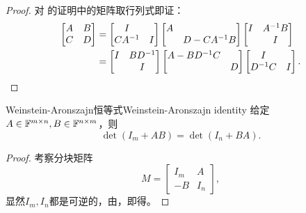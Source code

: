 \begin{proof}
	对 的证明中的矩阵取行列式即证：
	\begin{align*}
		\begin{bmatrix}
			A&B\\C&D
		\end{bmatrix}&=\begin{bmatrix}
			I\\CA^{-1}&I
		\end{bmatrix}\begin{bmatrix}
			A\\ &D-CA^{-1} B
		\end{bmatrix}\begin{bmatrix}
			I&A^{-1} B\\ &I
		\end{bmatrix}\\
		&=\begin{bmatrix}
			I&BD^{-1}\\ &I
		\end{bmatrix}\begin{bmatrix}
			A-BD^{-1} C\\ &D
		\end{bmatrix}\begin{bmatrix}
			I\\D^{-1} C&I
		\end{bmatrix}.
		\qedhere
	\end{align*}
\end{proof}

\begin{theorem}
	{Weinstein-Aronszajn恒等式}{Weinstein-Aronszajn identity}
	给定$A\in\mathbb F^{m\times n},B\in\mathbb F^{n\times m}$，则 
	\begin{equation}
		\label{eqn:det(I+AB)=det(I+BA)}
		\det(I_m+AB)=\det(I_n+BA).
	\end{equation}
\end{theorem}
\begin{proof}
	考察分块矩阵
	\[
		M=\begin{bmatrix}
			I_m&A\\-B&I_n
		\end{bmatrix},
	\]
	显然$I_m,I_n$都是可逆的，由，即得。
\end{proof}


